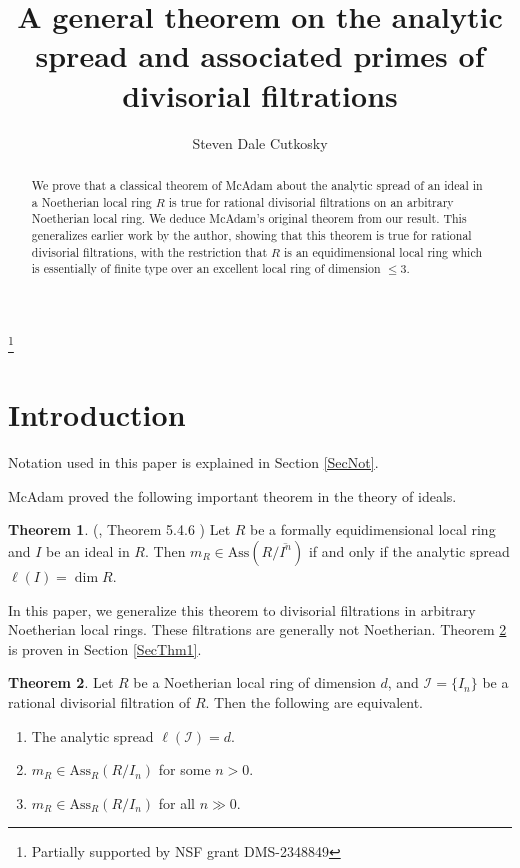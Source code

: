 \documentclass[11pt]{amsart}
\theoremstyle{definition}
\newtheorem{Theorem}{Theorem}[section]
\begin{document}
\title{A general theorem on the analytic spread and associated primes of divisorial filtrations}
\author{Steven Dale Cutkosky}
\thanks{Partially supported by NSF grant DMS-2348849}

\address{Steven Dale Cutkosky, Department of Mathematics,
University of Missouri, Columbia, MO 65211, USA}





\begin{abstract} 
We prove that a classical theorem of McAdam about the  analytic spread of an ideal in a Noetherian local ring $R$ is true for rational divisorial filtrations on an
arbitrary Noetherian local ring. We deduce McAdam's original theorem from our result.
This generalizes earlier work by the author, showing that this theorem is true for rational divisorial filtrations, with the restriction that $R$
 is an equidimensional local ring which is essentially of finite type over an excellent local ring of dimension $\le 3$.
\end{abstract}

\maketitle 



\section{Introduction}

Notation used in this paper is explained in Section \ref{SecNot}.

McAdam proved the following important theorem in the theory of ideals. 
\begin{Theorem}\label{Theorem2}(\cite{McA}, Theorem 5.4.6 \cite{HS})  Let $R$ be a formally equidimensional local ring and $I$ be an ideal in $R$. Then $m_R\in \mbox{Ass}(R/\overline{I^n})$ if and only if the analytic spread $\ell(I)=\dim R$.
\end{Theorem}

In this paper, we generalize this theorem to divisorial filtrations in arbitrary Noetherian local rings. These filtrations are generally not Noetherian. Theorem \ref{Theorem1} is proven in Section \ref{SecThm1}.

 \begin{Theorem}\label{Theorem1} Let $R$ be a Noetherian local ring of dimension $d$, and $\mathcal I=\{I_n\}$ be a rational divisorial filtration of $R$. Then the following are equivalent. 
 \begin{enumerate}
 \item[1)] The analytic spread $\ell(\mathcal I)=d$.
 \item[2)] $m_R\in \mbox{Ass}_R(R/I_n)$ for some $n>0$.
 \item[3)] $m_R\in \mbox{Ass}_R(R/I_n)$ for all $n\gg 0$.
 \end{enumerate}
 \end{Theorem}
 
\end{document}
